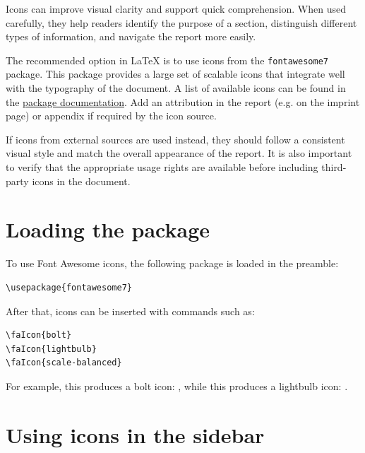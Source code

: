 \documentclass[11pt,a4paper]{report}
\begin{document}
Icons can improve visual clarity and support quick comprehension. When used carefully, they help readers identify the purpose of a section, distinguish different types of information, and navigate the report more easily.

The recommended option in \LaTeX{} is to use icons from the \texttt{fontawesome7} package. This package provides a large set of scalable icons that integrate well with the typography of the document. A list of available icons can be found in the \href{https://mirror.easyname.at/ctan/fonts/fontawesome7/doc/fontawesome7.pdf}{package documentation}. Add an attribution in the report (e.g. on the imprint page) or appendix if required by the icon source.

If icons from external sources are used instead, they should follow a consistent visual style and match the overall appearance of the report. It is also important to verify that the appropriate usage rights are available before including third-party icons in the document.

\section{Loading the package}

To use Font Awesome icons, the following package is loaded in the preamble:

\begin{coloredBlock}[grey]{}
\begin{verbatim}
\usepackage{fontawesome7}
\end{verbatim} 
\end{coloredBlock}

After that, icons can be inserted with commands such as:

\begin{coloredBlock}[grey]{}
\begin{verbatim}
\faIcon{bolt}
\faIcon{lightbulb}
\faIcon{scale-balanced}
\end{verbatim}
\end{coloredBlock}

For example, this produces a bolt icon: , while this produces a lightbulb icon: .

\section{Using icons in the sidebar}

\end{document}
